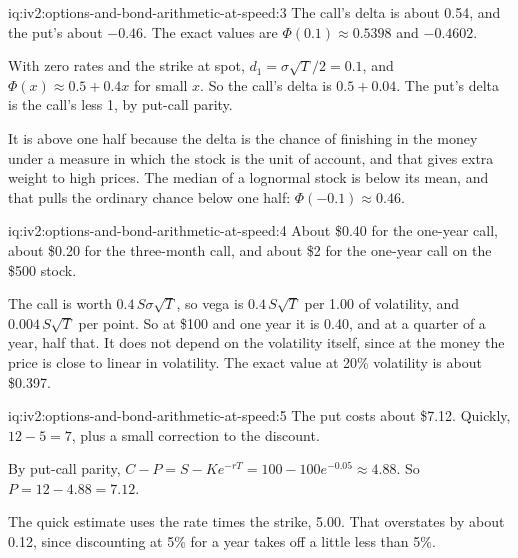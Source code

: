 \begin{solution}{iq:iv2:options-and-bond-arithmetic-at-speed:3}
The call's delta is about 0.54, and the put's about $-0.46$. The exact values are $\Phi(0.1) \approx 0.5398$ and $-0.4602$.

With zero rates and the strike at spot, $d_1 = \sigma\sqrt T/2 = 0.1$, and $\Phi(x) \approx 0.5 + 0.4x$ for small $x$. So the call's delta is $0.5 + 0.04$. The put's delta is the call's less 1, by put-call parity.

It is above one half because the delta is the chance of finishing in the money under a measure in which the stock is the unit of account, and that gives extra weight to high prices. The median of a lognormal stock is below its mean, and that pulls the ordinary chance below one half: $\Phi(-0.1) \approx 0.46$.

\end{solution}

\begin{solution}{iq:iv2:options-and-bond-arithmetic-at-speed:4}
About \$0.40 for the one-year call, about \$0.20 for the three-month call, and about \$2 for the one-year call on the \$500 stock.

The call is worth $0.4\,S\sigma\sqrt T$, so vega is $0.4\,S\sqrt T$ per 1.00 of volatility, and $0.004\,S\sqrt T$ per point. So at \$100 and one year it is 0.40, and at a quarter of a year, half that. It does not depend on the volatility itself, since at the money the price is close to linear in volatility. The exact value at 20\% volatility is about \$0.397.

\end{solution}

\begin{solution}{iq:iv2:options-and-bond-arithmetic-at-speed:5}
The put costs about \$7.12. Quickly, $12 - 5 = 7$, plus a small correction to the discount.

By put-call parity, $C - P = S - Ke^{-rT} = 100 - 100e^{-0.05} \approx 4.88$. So $P = 12 - 4.88 = 7.12$.

The quick estimate uses the rate times the strike, 5.00. That overstates by about 0.12, since discounting at 5\% for a year takes off a little less than 5\%.

\end{solution}

